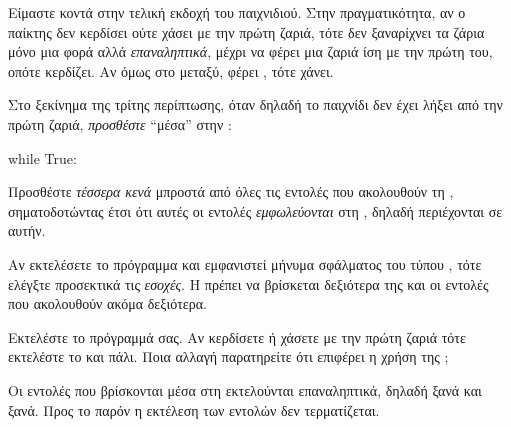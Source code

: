 \documentclass[a4paper,11pt,oneside]{book}
\begin{document}
Είμαστε κοντά στην τελική εκδοχή του παιχνιδιού. Στην πραγματικότητα, αν ο παίκτης δεν κερδίσει ούτε χάσει με την πρώτη ζαριά, τότε δεν ξαναρίχνει τα ζάρια μόνο μια φορά αλλά \emph{επαναληπτικά}, μέχρι να φέρει μια ζαριά ίση με την πρώτη του, οπότε κερδίζει. Αν όμως στο μεταξύ, φέρει , τότε χάνει.


\begin{step}
Στο ξεκίνημα της τρίτης περίπτωσης, όταν δηλαδή το παιχνίδι δεν έχει λήξει από την πρώτη ζαριά, 
\emph{προσθέστε} ``μέσα'' στην :

\begin{pynew}
while True:
\end{pynew}

Προσθέστε \emph{τέσσερα κενά} μπροστά από όλες τις εντολές που ακολουθούν τη , σηματοδοτώντας έτσι ότι αυτές οι εντολές \emph{εμφωλεύονται} στη , δηλαδή περιέχονται σε αυτήν.

\clearpage
\marginnote[16pt]{\iconcaution}
Αν εκτελέσετε το πρόγραμμα και εμφανιστεί μήνυμα σφάλματος του τύπου , τότε ελέγξτε προσεκτικά τις \emph{εσοχές}. H  πρέπει να βρίσκεται δεξιότερα της  και οι εντολές που ακολουθούν ακόμα δεξιότερα.

Εκτελέστε το πρόγραμμά σας. Αν κερδίσετε ή χάσετε με την πρώτη ζαριά τότε εκτελέστε το και πάλι. Ποια αλλαγή παρατηρείτε ότι επιφέρει η χρήση της ;

\begin{answer}
Οι εντολές που βρίσκονται μέσα στη  εκτελούνται επαναληπτικά, δηλαδή ξανά και ξανά. Προς το παρόν η εκτέλεση των εντολών δεν τερματίζεται.
\end{answer}
\end{step}
\end{document}
